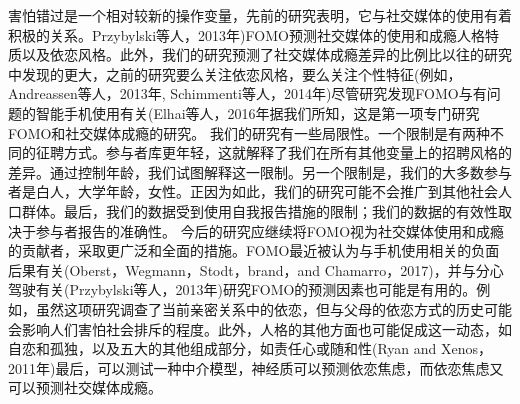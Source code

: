 害怕错过是一个相对较新的操作变量，先前的研究表明，它与社交媒体的使用有着积极的关系。Przybylski等人，2013年)FOMO预测社交媒体的使用和成瘾人格特质以及依恋风格。此外，我们的研究预测了社交媒体成瘾差异的比例比以往的研究中发现的更大，之前的研究要么关注依恋风格，要么关注个性特征(例如，Andreassen等人，2013年, Schimmenti等人，2014年)尽管研究发现FOMO与有问题的智能手机使用有关(Elhai等人，2016年据我们所知，这是第一项专门研究FOMO和社交媒体成瘾的研究。
我们的研究有一些局限性。一个限制是有两种不同的征聘方式。参与者库更年轻，这就解释了我们在所有其他变量上的招聘风格的差异。通过控制年龄，我们试图解释这一限制。另一个限制是，我们的大多数参与者是白人，大学年龄，女性。正因为如此，我们的研究可能不会推广到其他社会人口群体。最后，我们的数据受到使用自我报告措施的限制；我们的数据的有效性取决于参与者报告的准确性。
今后的研究应继续将FOMO视为社交媒体使用和成瘾的贡献者，采取更广泛和全面的措施。FOMO最近被认为与手机使用相关的负面后果有关(Oberst，Wegmann，Stodt，brand，and Chamarro，2017)，并与分心驾驶有关(Przybylski等人，2013年)研究FOMO的预测因素也可能是有用的。例如，虽然这项研究调查了当前亲密关系中的依恋，但与父母的依恋方式的历史可能会影响人们害怕社会排斥的程度。此外，人格的其他方面也可能促成这一动态，如自恋和孤独，以及五大的其他组成部分，如责任心或随和性(Ryan and Xenos，2011年)最后，可以测试一种中介模型，神经质可以预测依恋焦虑，而依恋焦虑又可以预测社交媒体成瘾。


